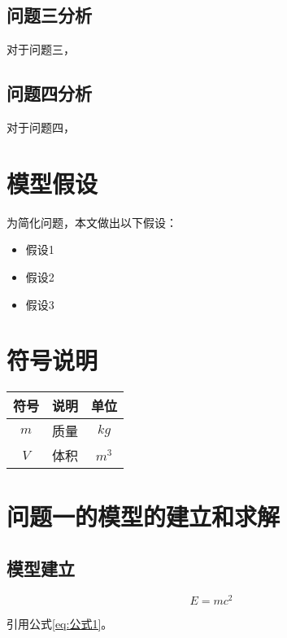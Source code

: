 \documentclass[withoutpreface,bwprint]{cumcmthesis}
\begin{document}
\subsection{问题三分析}
对于问题三，

\subsection{问题四分析}
对于问题四，


\section{模型假设}

为简化问题，本文做出以下假设：

\begin{itemize}[itemindent=2em]
\item 假设1
\item 假设2
\item 假设3
\end{itemize}


\section{符号说明}
\begin{table}[H]
\centering
\begin{tabularx}{\textwidth}{CLC}
\toprule
符号    & 说明    & 单位 \\
\midrule
$m     $& 质量 & $kg$ \\
$V     $& 体积 & $m^3$ \\
\bottomrule
\end{tabularx}
\label{tab:符号说明}
\end{table}



\section{问题一的模型的建立和求解}
\subsection{模型建立}

$$
E = mc^2
$$

引用公式\cref{eq:公式1}。
\end{document}
